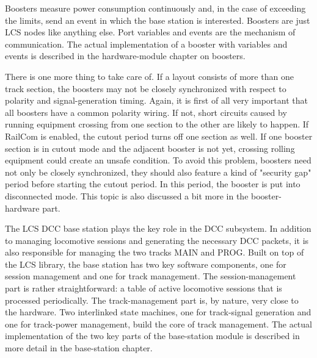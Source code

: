 \begin{center}
\end{center}

Boosters measure power consumption continuously and, in the case of exceeding the limits, send an event in which the base station is interested. Boosters are just LCS nodes like anything else. Port variables and events are the mechanism of communication. The actual implementation of a booster with variables and events is described in the hardware-module chapter on boosters.

There is one more thing to take care of. If a layout consists of more than one track section, the boosters may not be closely synchronized with respect to polarity and signal-generation timing. Again, it is first of all very important that all boosters have a common polarity wiring. If not, short circuits caused by running equipment crossing from one section to the other are likely to happen. If RailCom is enabled, the cutout period turns off one section as well. If one booster section is in cutout mode and the adjacent booster is not yet, crossing rolling equipment could create an unsafe condition. To avoid this problem, boosters need not only be closely synchronized, they should also feature a kind of "security gap" period before starting the cutout period. In this period, the booster is put into disconnected mode. This topic is also discussed a bit more in the booster-hardware part.


The LCS DCC base station plays the key role in the DCC subsystem. In addition to managing locomotive sessions and generating the necessary DCC packets, it is also responsible for managing the two tracks MAIN and PROG. Built on top of the LCS library, the base station has two key software components, one for session management and one for track management. The session-management part is rather straightforward: a table of active locomotive sessions that is processed periodically. The track-management part is, by nature, very close to the hardware. Two interlinked state machines, one for track-signal generation and one for track-power management, build the core of track management. The actual implementation of the two key parts of the base-station module is described in more detail in the base-station chapter.

